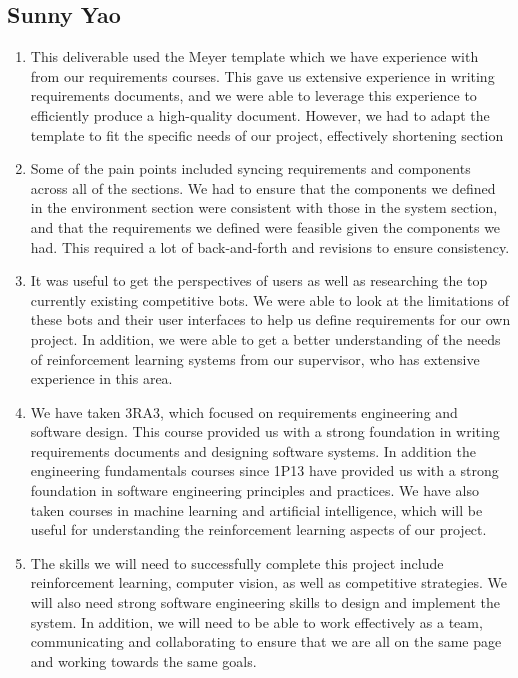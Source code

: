 \documentclass{article}
\begin{document}
\subsection*{Sunny Yao}\label{subsec:sunny-yao}
\begin{enumerate}
    \item 
    This deliverable used the Meyer template which we have experience with from
    our requirements courses. This gave us extensive experience in writing
    requirements documents, and we were able to leverage this experience to
    efficiently produce a high-quality document. However, we had to adapt the
    template to fit the specific needs of our project, effectively shortening
    section

    \item Some of the pain points included syncing requirements and components
    across all of the sections. We had to ensure that the components we
    defined in the environment section were consistent with those in the system
    section, and that the requirements we defined were feasible given the
    components we had. This required a lot of back-and-forth and revisions to
    ensure consistency.

    \item It was useful to get the perspectives of users as well as researching the 
    top currently existing competitive \emph{\Catan{}} bots. We were able to look at the limitations
    of these bots and their user interfaces to help us define requirements for our own project.
    In addition, we were able to get a better understanding of the needs of reinforcement
    learning systems from our supervisor, who has extensive experience in this area.

    \item We have taken 3RA3, which focused on requirements engineering and software design.
    This course provided us with a strong foundation in writing requirements documents
    and designing software systems. In addition the engineering fundamentals courses since
    1P13 have provided us with a strong foundation in software engineering principles and practices.
    We have also taken courses in machine learning and artificial intelligence, which will be useful
    for understanding the reinforcement learning aspects of our project.

    \item The skills we will need to successfully complete this project include reinforcement
    learning, computer vision, as well as competitive \emph{\Catan{}} strategies. We will also need
    strong software engineering skills to design and implement the system. In addition, we will
    need to be able to work effectively as a team, communicating and collaborating to ensure
    that we are all on the same page and working towards the same goals.


\end{enumerate}
\end{document}
